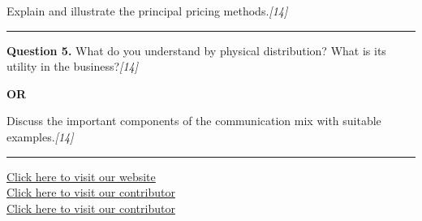 \documentclass[11pt,a4paper]{article}
\newcommand{\pts}[1]{\hfill   \textit{[#1]}}
\begin{document}
Explain and illustrate the principal pricing methods.\pts{14}

\medskip\rule{\linewidth}{0.2pt}




\noindent   \textbf{Question 5.}
What do you understand by physical distribution? What is its utility in the business?\pts{14}

\centerline{   \textbf{OR}}

Discuss the important components of the communication mix with suitable examples.\pts{14}

\vfill
\rule{\linewidth}{0.4pt}

\begin{center}\small
\href{https://bhu-exam.vercel.app/}{Click here to visit our website}\\[4pt]
\href{https://me-aryan.vercel.app/}{Click here to visit our contributor}\\[4pt]
\href{https://quashan-me.vercel.app/}{Click here to visit our contributor}
\end{center}
\end{document}
